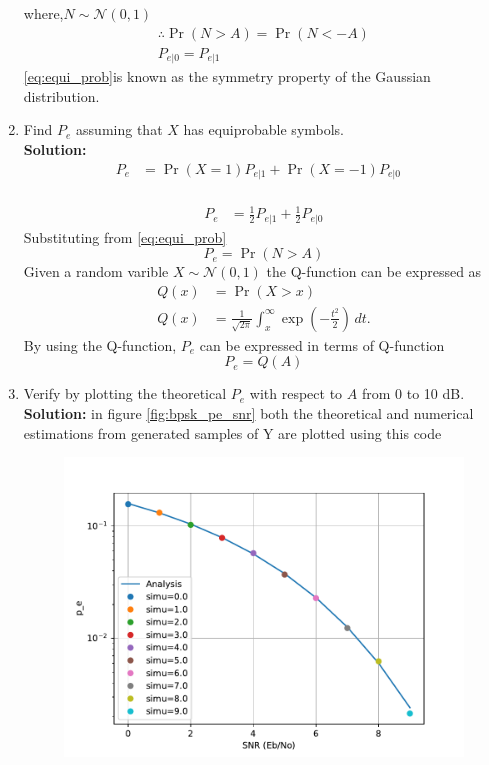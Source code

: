 \documentclass[12pt]{book}
\providecommand{\pr}[1]{\ensuremath{\Pr\left(#1\right)}}
\newcommand{\solution}{\noindent \textbf{Solution: }}
\providecommand{\gauss}[2]{\mathcal{N}\ensuremath{\left(#1,#2\right)}}
\begin{document}
\begin{enumerate}
where,$N \sim \gauss{0}{1}$\\
\begin{align}
 \therefore \pr{N>A}=\pr{N<-A}\\
 P_{e|0}=P_{e|1} \label{eq:equi_prob}
\end{align}
\eqref{eq:equi_prob}is known as the symmetry property of the Gaussian distribution.
\item Find $P_e$ assuming that $X$ has equiprobable symbols.\\
 \solution \begin{align}
	P_e &= \pr{X=1}P_{e|1} + \pr{X=-1}P_{e|0}& \label{eq:Pe_of_X}
	\end{align}
	\\
	\begin{align}
	P_e &= \frac{1}{2}P_{e|1} + \frac{1}{2}P_{e|0}
\end{align}
Substituting from \eqref{eq:equi_prob}
\begin{equation}
	P_e = \pr{N > A}
\end{equation}
Given a random varible $X \sim \gauss{0}{1}$ the Q-function can be expressed as
\begin{align}
	Q(x) &= \pr{X > x}\\
	\label{eq:q_func_integral}
	Q(x) &= \frac{1}{\sqrt{2\pi}} \int_x^\infty \exp\left(-\frac{t^2}{2}\right) \, dt.
\end{align}
By using the Q-function, $P_e$ can be expressed in terms of Q-function
\begin{equation}
	P_e = Q(A)
\end{equation} 
\item
Verify by plotting  the theoretical $P_e$ with respect to $A$ from 0 to 10 dB.\\
\solution 
in figure \ref{fig:bpsk_pe_snr} both the theoretical and numerical estimations from generated samples of Y are plotted using this code
\begin{center}
\end{center}
\begin{figure}[H]
\centering
\includegraphics[width=\columnwidth]{./figs/3/3.1.7.pdf}

\end{figure}
\end{enumerate}
\end{document}
